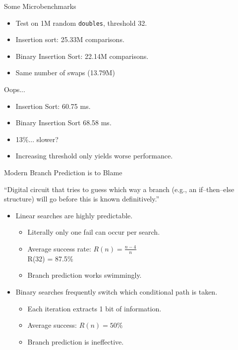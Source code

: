 \documentclass[13pt]{beamer}
\begin{document}
\begin{frame}{Some Microbenchmarks}
	\begin{itemize}
		\item Test on 1M random \texttt{doubles}, threshold 32.
		\item Insertion sort: 25.33M comparisons.
		\item Binary Insertion Sort: 22.14M comparisons.
		\item Same number of swaps (13.79M)
	\end{itemize}
\end{frame}

\begin{frame}{Oops...}
	\begin{itemize}[<+->]
		\item Insertion Sort: 60.75 ms.
		\item Binary Insertion Sort 68.58 ms.
		\item 13\%... slower?
		\item Increasing threshold only yields worse performance.
	\end{itemize}
\end{frame}

\begin{frame}{Modern Branch Prediction is to Blame}
	\begin{displayquote}
		``Digital circuit that tries to guess which way a branch (e.g., an
		if–then–else structure) will go before this is known definitively.''
	\end{displayquote}

	\begin{itemize}
		\item\pause Linear searches are highly predictable.
		\begin{itemize}
			\item Literally only one fail can occur per search.
			\item Average success rate: $R(n) = \frac{n - 4}{n}$\\
			      R(32) = 87.5\%
			\item Branch prediction works swimmingly.
		\end{itemize}
		\item\pause Binary searches frequently switch which conditional path is taken.
		\begin{itemize}
			\item Each iteration extracts 1 bit of information.
			\item Average success: $R(n) = 50\%$
			\item Branch prediction is ineffective.
		\end{itemize}
	\end{itemize}
\end{frame}
\end{document}
